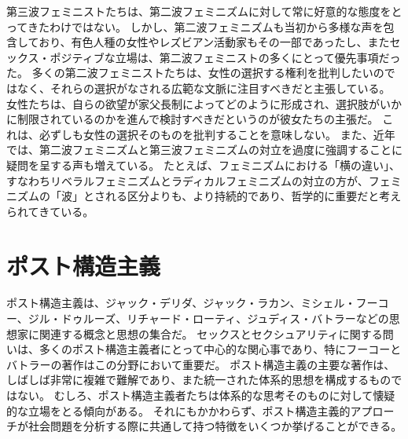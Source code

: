 \documentclass[paper=a4,book,openany]{jlreq}
\begin{document}
第三波フェミニストたちは、第二波フェミニズムに対して常に好意的な態度をとってきたわけではない。
しかし、第二波フェミニズムも当初から多様な声を包含しており、有色人種の女性やレズビアン活動家もその一部であったし、またセックス・ポジティブな立場は、第二波フェミニストの多くにとって優先事項だった。
多くの第二波フェミニストたちは、女性の選択する権利を批判したいのではなく、それらの選択がなされる広範な文脈に注目すべきだと主張している。
女性たちは、自らの欲望が家父長制によってどのように形成され、選択肢がいかに制限されているのかを進んで検討すべきだというのが彼女たちの主張だ。
これは、必ずしも女性の選択そのものを批判することを意味しない。
また、近年では、第二波フェミニズムと第三波フェミニズムの対立を過度に強調することに疑問を呈する声も増えている。
たとえば、フェミニズムにおける「横の違い」、すなわちリベラルフェミニズムとラディカルフェミニズムの対立の方が、フェミニズムの「波」とされる区分よりも、より持続的であり、哲学的に重要だと考えられてきている。

\section{ポスト構造主義}

ポスト構造主義は、ジャック・デリダ、ジャック・ラカン、ミシェル・フーコー、ジル・ドゥルーズ、リチャード・ローティ、ジュディス・バトラーなどの思想家に関連する概念と思想の集合だ。
セックスとセクシュアリティに関する問いは、多くのポスト構造主義者にとって中心的な関心事であり、特にフーコーとバトラーの著作はこの分野において重要だ。
ポスト構造主義の主要な著作は、しばしば非常に複雑で難解であり、また統一された体系的思想を構成するものではない。
むしろ、ポスト構造主義者たちは体系的な思考そのものに対して懐疑的な立場をとる傾向がある。
それにもかかわらず、ポスト構造主義的アプローチが社会問題を分析する際に共通して持つ特徴をいくつか挙げることができる。
\end{document}
